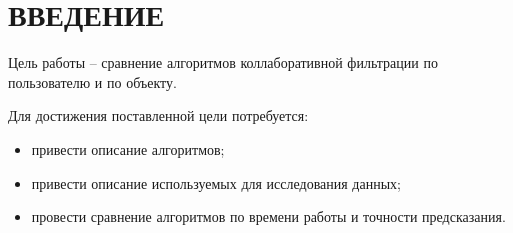 \section*{ВВЕДЕНИЕ}

Цель работы -- сравнение алгоритмов коллаборативной фильтрации по пользователю и по объекту.

Для достижения поставленной цели потребуется:
\begin{itemize}
	\item привести описание алгоритмов;
	\item привести описание используемых для исследования данных;
	\item провести сравнение алгоритмов по времени работы и точности предсказания.
\end{itemize}

\pagebreak